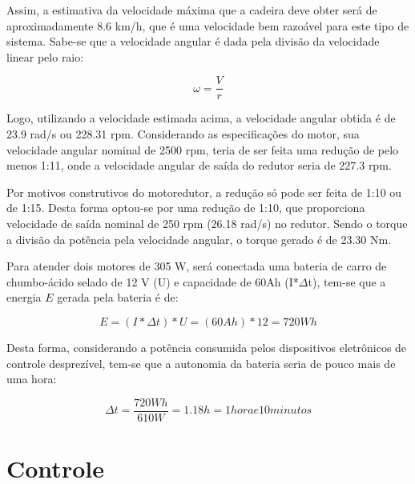 Assim, a estimativa da velocidade máxima que a cadeira deve obter será de aproximadamente 8.6 km/h, que é uma velocidade bem razoável para este tipo de sistema. Sabe-se que a velocidade angular é dada pela divisão da velocidade linear pelo raio:

\begin{equation}
\omega = \frac{V}{r}
\end{equation}

Logo, utilizando a velocidade estimada acima, a velocidade angular obtida é de 23.9 rad/s ou 228.31 rpm. Considerando as especificações do motor, sua velocidade angular nominal de 2500 rpm, teria de ser feita uma redução de pelo menos 1:11, onde a velocidade angular de saída do redutor seria de 227.3 rpm. 

Por motivos construtivos do motoredutor, a redução só pode ser feita de 1:10 ou de 1:15. Desta forma optou-se por uma redução de 1:10, que proporciona velocidade de saída nominal de 250 rpm (26.18 rad/s) no redutor. Sendo o torque a divisão da potência pela velocidade angular, o torque gerado é de 23.30 Nm.

Para atender dois motores de 305 W, será conectada uma bateria de carro de chumbo-ácido selado de 12 V (U) e capacidade de 60Ah (I*$\Delta$t), tem-se que a energia $E$ gerada pela bateria é de:

\begin{equation}
E = (I*\Delta t)*U = (60Ah)*12 = 720Wh
\end{equation}

Desta forma, considerando a potência consumida pelos dispositivos eletrônicos de controle desprezível, tem-se que a autonomia da bateria seria de pouco mais de uma hora:

\begin{equation}
\Delta t = \frac{720 Wh}{610 W} = 1.18 h = 1 hora e 10 minutos
\end{equation}

\section{Controle}

